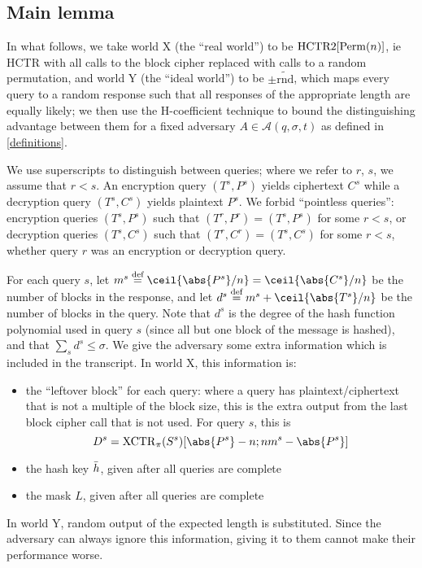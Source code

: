 \documentclass[hctr2.tex]{subfiles}
\begin{document}
\subsection{Main lemma}\label{mainlemma}
In what follows, we take world X (the ``real world'') 
to be \(\operatorname{HCTR2}[\operatorname{Perm}(n)]\),
ie HCTR with all calls to the block cipher
replaced with calls to a random permutation,
and world Y (the ``ideal world'') to be \(\pm\widetilde{\mathrm{rnd}}\),
which maps every query to a random response such that
all responses of the appropriate length are equally likely;
we then use the H-coefficient technique to bound
the distinguishing advantage between them
for a fixed adversary \(A \in \mathcal{A}(q, \sigma, t)\)
as defined in \autoref{definitions}.

We use superscripts to distinguish between queries;
where we refer to \(r\), \(s\), we assume that \(r < s\).
An encryption query \((T^s, P^s)\) yields ciphertext \(C^s\)
while a decryption query \((T^s, C^s)\)
yields plaintext \(P^s\).
We forbid ``pointless queries'':
encryption queries \((T^s, P^s)\)
such that \((T^r, P^r) = (T^s, P^s)\) for some \(r < s\), 
or decryption queries \((T^s, C^s)\)
such that \((T^r, C^r) = (T^s, C^s)\) for some \(r < s\),
whether query \(r\) was an encryption or decryption query.

For each query \(s\), 
let \(m^s \defeq \ceil{\abs{P^s}/n} = \ceil{\abs{C^s}/n}\)
be the number of blocks in the response,
and let \(d^s \defeq m^s + \ceil{\abs{T^s}/n}\)
be the number of blocks in the query.
Note that \(d^s\) is the degree of the hash
function polynomial used in query \(s\)
(since all but one block of the message is hashed),
and that \(\sum_s d^s \leq \sigma\).
We give the adversary some extra information
which is included in the transcript.
In world X, this information is:
\begin{itemize}
    \item the ``leftover block'' for each query:
    where a query has plaintext/ciphertext
    that is not a multiple of the block size,
    this is the extra output from the last
    block cipher call that is not used.
    For query \(s\), this is 
    \begin{displaymath}
        D^s = \XCTR_\pi(S^s)[\abs{P^s} - n; nm^s-\abs{P^s}]
    \end{displaymath}
    \item the hash key \(\bar{h}\), given after all queries are complete
    \item the mask \(L\), given after all queries are complete
\end{itemize}
In world Y, random output of the expected
length is substituted. Since the adversary can always ignore
this information, giving it to them cannot make their performance worse.
\end{document}
